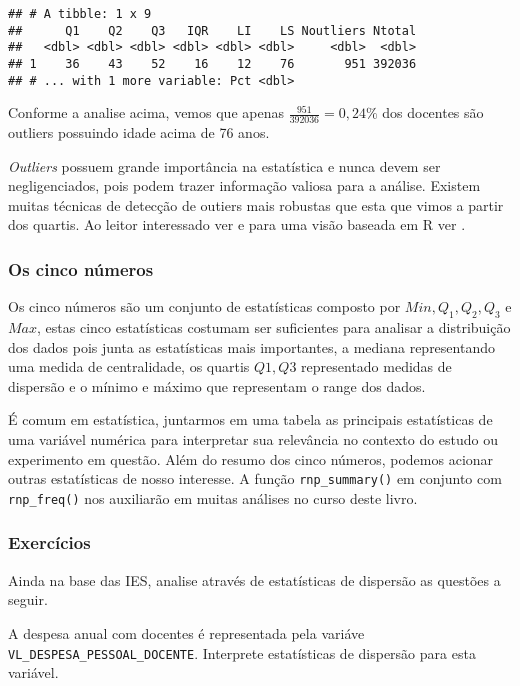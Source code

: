 \documentclass[12pt,]{style/krantz}
\renewenvironment{quote}{\begin{VF}}{\end{VF}}
\theoremstyle{definition}
\theoremstyle{definition}
\theoremstyle{definition}
\theoremstyle{remark}
\let\BeginKnitrBlock\begin \let\EndKnitrBlock\end
\begin{document}
\begin{verbatim}
## # A tibble: 1 x 9
##      Q1    Q2    Q3   IQR    LI    LS Noutliers Ntotal
##   <dbl> <dbl> <dbl> <dbl> <dbl> <dbl>     <dbl>  <dbl>
## 1    36    43    52    16    12    76       951 392036
## # ... with 1 more variable: Pct <dbl>
\end{verbatim}

Conforme a analise acima, vemos que apenas
\(\frac{951}{392036} = 0,24\%\) dos docentes são outliers possuindo
idade acima de 76 anos.

\begin{quote}
\emph{Outliers} possuem grande importância na estatística e nunca devem
ser negligenciados, pois podem trazer informação valiosa para a análise.
Existem muitas técnicas de detecção de outiers mais robustas que esta
que vimos a partir dos quartis. Ao leitor interessado ver
\citep{barnett1974outliers} e para uma visão baseada em R ver
\citep{outliers}.
\end{quote}

\subsubsection{Os cinco números}\label{os-cinco-numeros}

Os cinco números são um conjunto de estatísticas composto por
\(Min, Q_1,Q_2,Q_3\) e \(Max\), estas cinco estatísticas costumam ser
suficientes para analisar a distribuição dos dados pois junta as
estatísticas mais importantes, a mediana representando uma medida de
centralidade, os quartis \(Q1,Q3\) representado medidas de dispersão e o
mínimo e máximo que representam o range dos dados.

É comum em estatística, juntarmos em uma tabela as principais
estatísticas de uma variável numérica para interpretar sua relevância no
contexto do estudo ou experimento em questão. Além do resumo dos cinco
números, podemos acionar outras estatísticas de nosso interesse. A
função \texttt{rnp\_summary()} em conjunto com \texttt{rnp\_freq()} nos
auxiliarão em muitas análises no curso deste livro.

\subsubsection{Exercícios}\label{exercicios-2}

Ainda na base das IES, analise através de estatísticas de dispersão as
questões a seguir.

\BeginKnitrBlock{exercise}
\protect\hypertarget{exr:unnamed-chunk-70}{}{\label{exr:unnamed-chunk-70} }A
despesa anual com docentes é representada pela variáve
\texttt{VL\_DESPESA\_PESSOAL\_DOCENTE}. Interprete estatísticas de
dispersão para esta variável.
\EndKnitrBlock{exercise}
\end{document}
